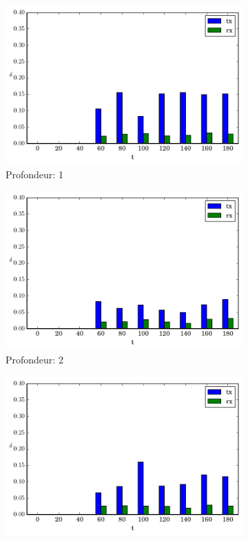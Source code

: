 \begin{figure}[h]
  \centering
  \begin{subfigure}{0.3\textwidth}
    \includegraphics[width=\textwidth]{img/evolution_noinfo_1.pdf}
    \caption{Profondeur: 1}
    \label{supervision:fig:noinfo_1}
  \end{subfigure}
  \begin{subfigure}{0.3\textwidth}
    \includegraphics[width=\textwidth]{img/evolution_noinfo_2.pdf}
    \caption{Profondeur: 2}
    \label{supervision:fig:noinfo_2}
  \end{subfigure}
  \begin{subfigure}{0.3\textwidth}
    \includegraphics[width=\textwidth]{img/evolution_noinfo_3.pdf}

\end{subfigure}
\end{figure}
